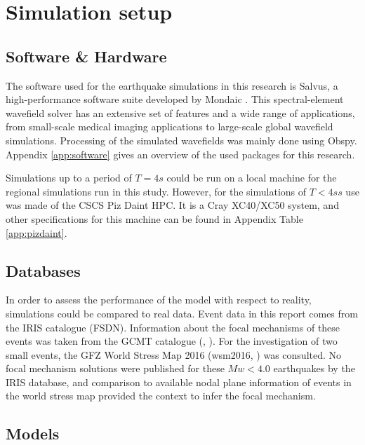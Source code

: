 \documentclass[../Text/00main.tex]{subfiles}
\begin{document}

\section{Simulation setup}




\subsection{Software \& Hardware}

The software used for the earthquake simulations in this research is Salvus, a high-performance software suite developed by Mondaic \citep{afanasiev_modular_2019}. This spectral-element wavefield solver has an extensive set of features and a wide range of applications, from small-scale medical imaging applications to large-scale global wavefield simulations. Processing of the simulated wavefields was mainly done using Obspy. Appendix \ref{app:software} gives an overview of the used packages for this research. 

Simulations up to a period of $T = 4 s$ could be run on a local machine for the regional simulations run in this study. However, for the simulations of $T < 4 s s$ use was made of the CSCS Piz Daint HPC. It is a Cray XC40/XC50 system, and other specifications for this machine can be found in Appendix Table \ref{app:pizdaint}. 


\subsection{Databases}


In order to assess the performance of the model with respect to reality, simulations could be compared to real data. Event data in this report comes from the IRIS catalogue (FSDN). Information about the focal mechanisms of these events was taken from the GCMT catalogue (\cite{dziewonski_determination_1981}, \cite{ekstrom2012global}). For the investigation of two small events, the GFZ World Stress Map 2016 (wsm2016, \cite{heidbach2016world}) was consulted. No focal mechanism solutions were published for these $Mw < 4.0$ earthquakes by the IRIS database, and comparison to available nodal plane information of events in the world stress map provided the context to infer the focal mechanism. 

\subsection{Models}
\end{document}
